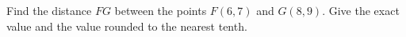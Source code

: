 Find the distance $FG$ between the points $F(6,7)$ and $G(8,9)$. Give the exact value and the value rounded to the nearest tenth.
